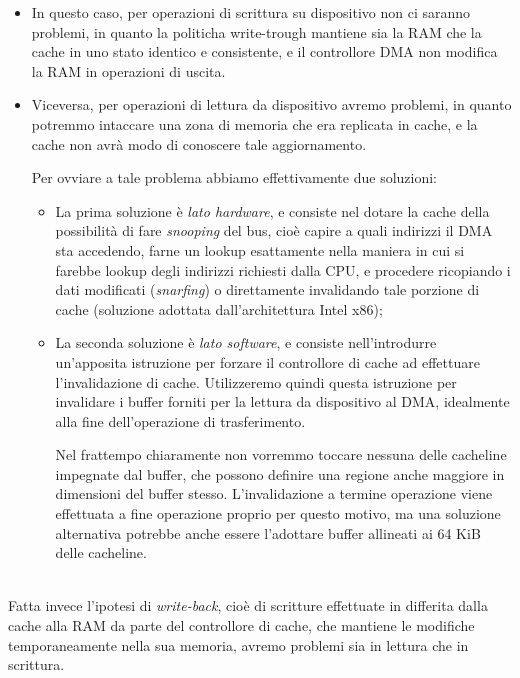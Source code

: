 \documentclass[a4paper,11pt]{article}
\begin{document}
\begin{itemize}
	\item 
		In questo caso, per operazioni di scrittura su dispositivo non ci saranno problemi, in quanto la politicha write-trough mantiene sia la RAM che la cache in uno stato identico e consistente, e il controllore DMA non modifica la RAM in operazioni di uscita.
	\item
		Viceversa, per operazioni di lettura da dispositivo avremo problemi, in quanto potremmo intaccare una zona di memoria che era replicata in cache, e la cache non avrà modo di conoscere tale aggiornamento.

		Per ovviare a tale problema abbiamo effettivamente due soluzioni:
		\begin{itemize}
			\item La prima soluzione è \textit{lato hardware}, e consiste nel dotare la cache della possibilità di fare \textit{snooping} del bus, cioè capire a quali indirizzi il DMA sta accedendo, farne un lookup esattamente nella maniera in cui si farebbe lookup degli indirizzi richiesti dalla CPU, e procedere ricopiando i dati modificati (\textit{snarfing}) o direttamente invalidando tale porzione di cache (soluzione adottata dall'architettura Intel x86);
			\item La seconda soluzione è \textit{lato software}, e consiste nell'introdurre un'apposita istruzione per forzare il controllore di cache ad effettuare l'invalidazione di cache.
				Utilizzeremo quindi questa istruzione per invalidare i buffer forniti per la lettura da dispositivo al DMA, idealmente alla fine dell'operazione di trasferimento.

				Nel frattempo chiaramente non vorremmo toccare nessuna delle cacheline impegnate dal buffer, che possono definire una regione anche maggiore in dimensioni del buffer stesso.
				L'invalidazione a termine operazione viene effettuata a fine operazione proprio per questo motivo, ma una soluzione alternativa potrebbe anche essere l'adottare buffer allineati ai 64 KiB delle cacheline.
		\end{itemize}
\end{itemize}

\par\smallskip
\noindent
\textbf{} \\
Fatta invece l'ipotesi di \textit{write-back}, cioè di scritture effettuate in differita dalla cache alla RAM da parte del controllore di cache, che mantiene le modifiche temporaneamente nella sua memoria, avremo problemi sia in lettura che in scrittura.
\end{document}
